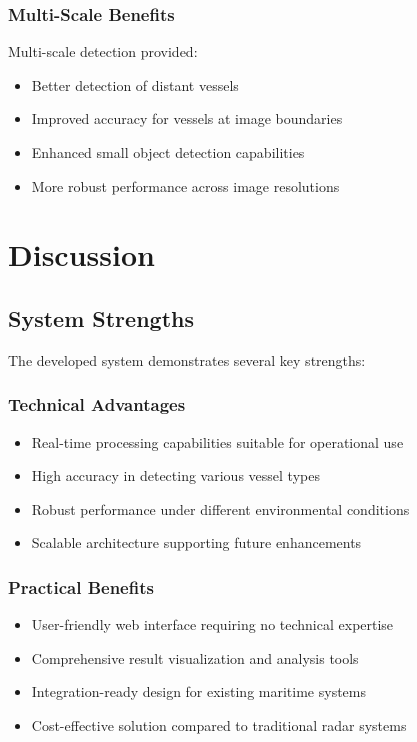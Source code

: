 \documentclass[12pt,a4paper]{report}
\begin{document}
\subsection{Multi-Scale Benefits}
Multi-scale detection provided:
\begin{itemize}
    \item Better detection of distant vessels
    \item Improved accuracy for vessels at image boundaries
    \item Enhanced small object detection capabilities
    \item More robust performance across image resolutions
\end{itemize}

\chapter{Discussion}

\section{System Strengths}
The developed system demonstrates several key strengths:

\subsection{Technical Advantages}
\begin{itemize}
    \item Real-time processing capabilities suitable for operational use
    \item High accuracy in detecting various vessel types
    \item Robust performance under different environmental conditions
    \item Scalable architecture supporting future enhancements
\end{itemize}

\subsection{Practical Benefits}
\begin{itemize}
    \item User-friendly web interface requiring no technical expertise
    \item Comprehensive result visualization and analysis tools
    \item Integration-ready design for existing maritime systems
    \item Cost-effective solution compared to traditional radar systems
\end{itemize}
\end{document}
